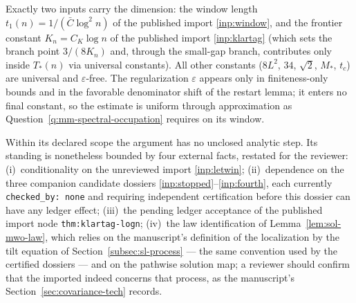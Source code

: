 \documentclass[../main.tex]{subfiles}
\begin{document}
\begin{remark}
\label{rem:sol-mwo-dimension}
Exactly two inputs carry the dimension: the window length $t_1(n)=1/(\bar C\log^2n)$
of the published import \ref{inp:window}, and the frontier constant $K_n=C_K\log n$ of
the published import \ref{inp:klartag} (which sets the branch point $3/(8K_n)$ and,
through the small-gap branch, contributes only inside $T_*(n)$ via universal
constants).  All other constants ($8L^2$, $34$, $\sqrt2$, $M_*$, $t_c$) are universal
and $\varepsilon$-free.  The regularization $\varepsilon$ appears only in
finiteness-only bounds and in the favorable denominator shift of the restart lemma;
it enters no final constant, so the estimate is uniform through approximation as
Question~\ref{q:mm-spectral-occupation} requires on its window.
\end{remark}

\begin{remark}
\label{rem:sol-mwo-gaps}
Within its declared scope the argument has no unclosed analytic step.  Its standing
is nonetheless bounded by four external facts, restated for the reviewer:
\textup{(i)}~conditionality on the unreviewed import \ref{inp:letwin};
\textup{(ii)}~dependence on the three companion candidate dossiers
\ref{inp:stopped}--\ref{inp:fourth}, each currently \texttt{checked\_by: none} and
requiring independent certification before this dossier can have any ledger effect;
\textup{(iii)}~the pending ledger acceptance of the published import node
\texttt{thm:klartag-logn}; \textup{(iv)}~the law identification of
Lemma~\ref{lem:sol-mwo-law}, which relies on the manuscript's definition of the
localization by the tilt equation of Section~\ref{subsec:sl-process} --- the same
convention used by the certified dossiers --- and on the pathwise solution map; a
reviewer should confirm that the imported \cite[Thm.~61]{KLnotes} indeed concerns that
process, as the manuscript's Section~\ref{sec:covariance-tech} records.
\end{remark}
\end{document}
